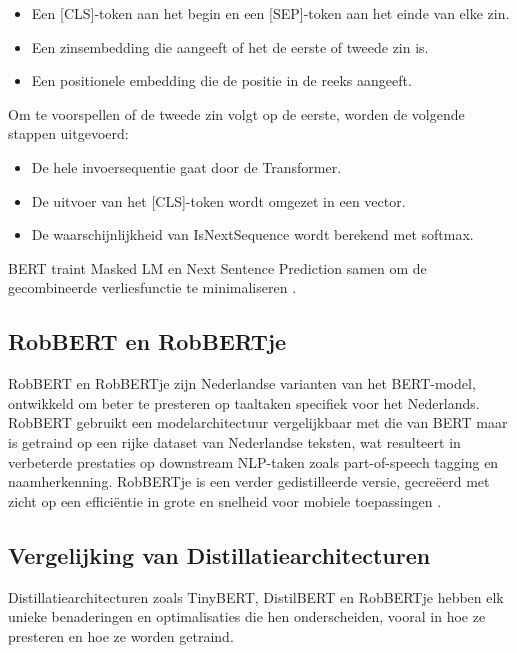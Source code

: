 \begin{itemize}
    \item Een [CLS]-token aan het begin en een [SEP]-token aan het einde van elke zin.
    \item Een zinsembedding die aangeeft of het de eerste of tweede zin is.
    \item Een positionele embedding die de positie in de reeks aangeeft.
\end{itemize}

Om te voorspellen of de tweede zin volgt op de eerste, worden de volgende stappen uitgevoerd:

\begin{itemize}
    \item De hele invoersequentie gaat door de Transformer.
    \item De uitvoer van het [CLS]-token wordt omgezet in een vector.
    \item De waarschijnlijkheid van IsNextSequence wordt berekend met softmax.
\end{itemize}

BERT traint Masked LM en Next Sentence Prediction samen om de gecombineerde verliesfunctie te minimaliseren \autocite{Devlin2019}.


\subsection{RobBERT en RobBERTje}

RobBERT en RobBERTje zijn Nederlandse varianten van het BERT-model, ontwikkeld om beter te presteren op taaltaken specifiek voor het Nederlands. RobBERT gebruikt een modelarchitectuur vergelijkbaar met die van BERT maar is getraind op een rijke dataset van Nederlandse teksten, wat resulteert in verbeterde prestaties op downstream NLP-taken zoals part-of-speech tagging en naamherkenning. RobBERTje is een verder gedistilleerde versie, gecreëerd met zicht op een efficiëntie in grote en snelheid voor mobiele toepassingen \autocite{Vries2019}.

\subsection{Vergelijking van Distillatiearchitecturen}

Distillatiearchitecturen zoals TinyBERT, DistilBERT en RobBERTje hebben elk unie\-ke benaderingen en optimalisaties die hen onderscheiden, vooral in hoe ze presteren en hoe ze worden getraind.

